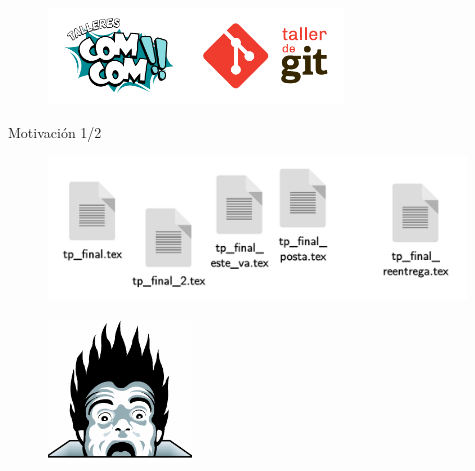 \begin{frame}
  \titlepage
  \begin{figure}[ht]
      \begin{center}
          \includegraphics[height=1in]{images/logo-taller.pdf}
      \end{center}
  \end{figure}
\end{frame}

\begin{frame}{Motivación 1/2}

    \begin{figure}[ht]
        \begin{center}
            \includegraphics[height=1.5in]{images/caos.pdf}
        \end{center}
    \end{figure}

    \pause
    \begin{figure}[ht]
        \begin{center}
            \includegraphics[height=1.5in]{images/horror.png}
        \end{center}
    \end{figure}

\end{frame}

